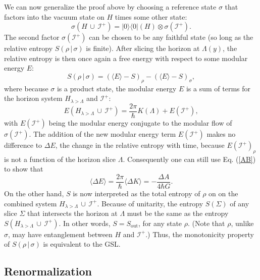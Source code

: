 \documentclass{article}
\begin{document}
We can now generalize the proof above by choosing a reference state $\sigma$ that factors into the vacuum state on $H$ times some other state:
\begin{equation}
\sigma(H\,\cup\,\mathcal{I}^+) = |0\rangle \langle 0|(H) \otimes \sigma(\mathcal{I}^+).
\end{equation}
The second factor $\sigma(\mathcal{I}^+)$ can be chosen to be any faithful state (so long as the relative entropy $S(\rho\,|\,\sigma)$ is finite).  After slicing the horizon at $\Lambda(y)$, the relative entropy is then once again a free energy with respect to some modular energy $E$:
\begin{equation}
S(\rho\,|\,\sigma) = ( \langle E \rangle - S)_\rho - (\langle E \rangle - S)_\sigma,
\end{equation}
where because $\sigma$ is a product state, the modular energy $E$ is a sum of terms for the horizon system $H_{\lambda > \Lambda}$ and $\mathcal{I}^+$:
\begin{equation}
E(H_{\lambda > \Lambda}\,\cup\,\mathcal{I}^+) = \frac{2\pi}{\hbar} K(\Lambda) + E(\mathcal{I}^+),
\end{equation}
with $E(\mathcal{I}^+)$ being the modular energy conjugate to the modular flow of $\sigma(\mathcal{I}^+)$.  The addition of the new modular energy term $E(\mathcal{I}^+)$ makes no difference to $\Delta E$, the change in the relative entropy with time, because $E(\mathcal{I}^+)_\rho$ is not a function of the horizon slice $\Lambda$.  Consequently one can still use Eq. (\ref{AB}) to show that
\begin{equation}
\langle \Delta E \rangle = \frac{2\pi}{\hbar} \langle \Delta K \rangle = -\frac{\Delta A}{4\hbar G}.
\end{equation}
On the other hand, $S$ is now interpreted as the total entropy of $\rho$ on on the combined system $H_{\lambda > \Lambda}\,\cup\,\mathcal{I}^+$.  Because of unitarity, the entropy $S(\Sigma)$ of any slice $\Sigma$ that intersects the horizon at $\Lambda$ must be the same as the entropy $S(H_{\lambda > \Lambda}\,\cup\,\mathcal{I}^+)$.  In other words, $S = S_\mathrm{out}$, for any state $\rho$.  (Note that $\rho$, unlike $\sigma$, may have entanglement between $H$ and $\mathcal{I}^+$.)  Thus, the monotonicity property of $S(\rho\,|\,\sigma)$ is equivalent to the GSL.

\subsection{Renormalization}\label{ren}
\end{document}
